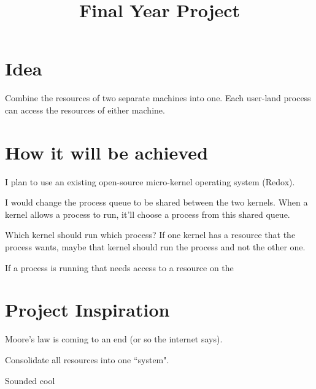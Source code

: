 \documentclass[11pt, a4paper]{article}
\title{\huge\textbf{Final Year Project}\vspace{-4ex}}
\date{}
\begin{document}
\maketitle

\section{Idea}
Combine the resources of two separate machines into one.
Each user-land process can access the resources of either machine.

\section{How it will be achieved}
I plan to use an existing open-source micro-kernel operating system (Redox).

I would change the process queue to be shared between the two kernels. When a 
kernel allows a process to run, it'll choose a process from this shared queue. 

Which kernel should run which process? If one kernel has a resource that the 
process wants, maybe that kernel should run the process and not the other one.

If a process is running that needs access to a resource on the

\section{Project Inspiration}
Moore's law is coming to an end (or so the internet says).

Consolidate all resources into one ``system".

Sounded cool
\end{document}

